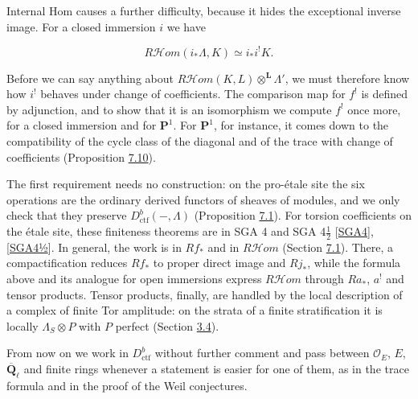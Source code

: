 \documentclass[11pt]{article}
\providecommand{\cHom}{}\renewcommand{\cHom}{R\mathcal{H}\!om}
\begin{document}
Internal Hom causes a further difficulty, because it hides the exceptional inverse image. For a closed immersion \(i\) we have

\[
\cHom(i_*\Lambda,K)\simeq i_*i^!K .
\]

Before we can say anything about \(\cHom(K,L)\otimes^{\mathbf L}\Lambda'\), we must therefore know how \(i^!\) behaves under change of coefficients. The comparison map for \(f^!\) is defined by adjunction, and to show that it is an isomorphism we compute \(f^!\) once more, for a closed immersion and for \(\mathbf P^1\). For \(\mathbf P^1\), for instance, it comes down to the compatibility of the cycle class of the diagonal and of the trace with change of coefficients (Proposition \hyperref[bp626]{7.10}).

The first requirement needs no construction: on the pro-étale site the six operations are the ordinary derived functors of sheaves of modules, and we only check that they preserve \(D^b_{\mathrm{ctf}}(-,\Lambda)\) (Proposition \hyperref[bp605]{7.1}). For torsion coefficients on the étale site, these finiteness theorems are in SGA 4 and SGA 4\(\tfrac12\) [\hyperref[bp702]{SGA4}], [\hyperref[bp703]{SGA4½}]. In general, the work is in \(Rf_*\) and in \(\cHom\) (Section \hyperref[bp603]{7.1}). There, a compactification reduces \(Rf_*\) to proper direct image and \(Rj_*\), while the formula above and its analogue for open immersions express \(\cHom\) through \(Ra_*\), \(a^!\) and tensor products. Tensor products, finally, are handled by the local description of a complex of finite Tor amplitude: on the strata of a finite stratification it is locally \(\Lambda_S\otimes P\) with \(P\) perfect (Section \hyperref[bp230]{3.4}).

From now on we work in \(D^b_{\mathrm{ctf}}\) without further comment and pass between \(\mathcal O_E\), \(E\), \(\overline{\mathbf Q}_\ell\) and finite rings whenever a statement is easier for one of them, as in the trace formula and in the proof of the Weil conjectures.

\end{document}
